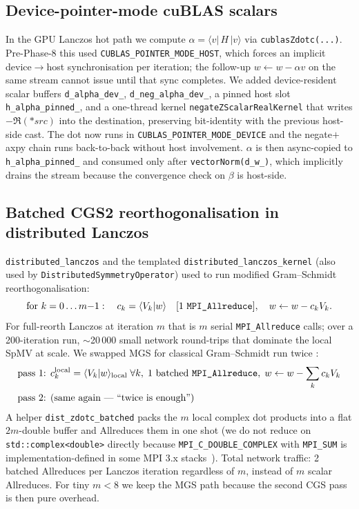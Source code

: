 \documentclass[submission, PhysCodeb]{SciPost}
\begin{document}
\subsection{Device-pointer-mode cuBLAS scalars}
\label{sec:perf-cublas}
In the GPU Lanczos hot path we compute $\alpha = \langle v |\,H\,| v
\rangle$ via \texttt{cublasZdotc(...)}. Pre-Phase-8 this used
\texttt{CUBLAS\_POINTER\_MODE\_HOST}, which forces an implicit
device$\to$host synchronisation per iteration; the follow-up
$w \leftarrow w - \alpha v$ on the same stream cannot issue until that
sync completes. We added device-resident scalar buffers
\texttt{d\_alpha\_dev\_}, \texttt{d\_neg\_alpha\_dev\_}, a pinned host
slot \texttt{h\_alpha\_pinned\_}, and a one-thread kernel
\texttt{negateZScalarRealKernel} that writes
$-\Re(*src)$ into the destination, preserving bit-identity with the
previous host-side cast. The dot now runs in
\texttt{CUBLAS\_POINTER\_MODE\_DEVICE} and the negate$+$axpy chain
runs back-to-back without host involvement. $\alpha$ is then
async-copied to \texttt{h\_alpha\_pinned\_} and consumed only after
\texttt{vectorNorm(d\_w\_)}, which implicitly drains the stream
because the convergence check on $\beta$ is host-side.

\subsection{Batched CGS2 reorthogonalisation in distributed Lanczos}
\label{sec:perf-cgs2}
\texttt{distributed\_lanczos} and the templated
\texttt{distributed\_lanczos\_kernel} (also used by
\texttt{DistributedSymmetryOperator}) used to run modified
Gram--Schmidt reorthogonalisation:
\[
\text{for } k = 0 \dots m{-}1:\quad
c_k = \langle V_k | w \rangle\quad\text{[1 \texttt{MPI\_Allreduce}]},\quad
w \leftarrow w - c_k V_k.
\]
For full-reorth Lanczos at iteration $m$ that is $m$ serial
\texttt{MPI\_Allreduce} calls; over a 200-iteration run, $\sim$20\,000
small network round-trips that dominate the local SpMV at scale. We
swapped MGS for classical Gram--Schmidt run twice
\cite{Bjorck1994CGS2,Giraud2005CGS2}:
\begin{equation*}
\begin{aligned}
\text{pass 1: } & c_k^{\rm local} = \langle V_k | w \rangle_{\rm local}
                  \;\forall k,\;
                  \text{1 batched \texttt{MPI\_Allreduce}}, \;
                  w \leftarrow w - \sum_k c_k V_k \\
\text{pass 2: } & \text{(same again --- ``twice is enough'')}
\end{aligned}
\end{equation*}
A helper \texttt{dist\_zdotc\_batched} packs the $m$ local complex
dot products into a flat $2m$-double buffer and Allreduces them in
one shot (we do not reduce on \texttt{std::complex<double>} directly
because \texttt{MPI\_C\_DOUBLE\_COMPLEX} with \texttt{MPI\_SUM} is
implementation-defined in some MPI 3.x stacks~\cite{MPIstandard}).
Total network traffic: 2 batched Allreduces per Lanczos iteration
regardless of $m$, instead of $m$ scalar Allreduces. For tiny
$m < 8$ we keep the MGS path because the second CGS pass is then
pure overhead.
\end{document}
